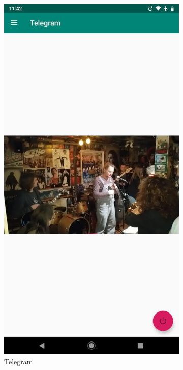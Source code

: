 \begin{figure}[H]
  \begin{subfigure}[b]{0.3\linewidth}
    \includegraphics[width=1\linewidth]{figures/telegram.jpg}
    \caption{Telegram}
  \end{subfigure}
  \begin{subfigure}[b]{0.3\linewidth}

\end{subfigure}
\end{figure}
